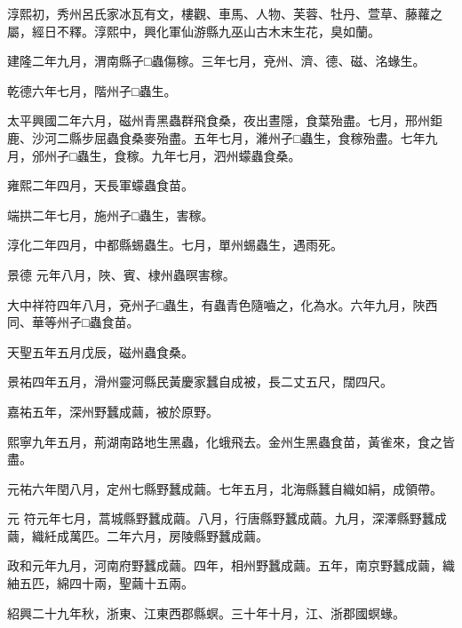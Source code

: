 \begin{pinyinscope}
 淳熙初，秀州呂氏家冰瓦有文，樓觀、車馬、人物、芙蓉、牡丹、萱草、藤蘿之屬，經日不釋。淳熙中，興化軍仙游縣九巫山古木末生花，臭如蘭。



 建隆二年九月，渭南縣孑□蟲傷稼。三年七月，兗州、濟、德、磁、洺蝝生。



 乾德六年七月，階州孑□蟲生。



 太平興國二年六月，磁州青黑蟲群飛食桑，夜出晝隱，食葉殆盡。七月，邢州鉅鹿、沙河二縣步屈蟲食桑麥殆盡。五年七月，濰州孑□蟲生，食稼殆盡。七年九月，邠州孑□蟲生，食稼。九年七月，泗州蠓蟲食桑。



 雍熙二年四月，天長軍蠓蟲食苗。



 端拱二年七月，施州孑□蟲生，害稼。



 淳化二年四月，中都縣蜴蟲生。七月，單州蜴蟲生，遇雨死。



 景德
 元年八月，陜、賓、棣州蟲暝害稼。



 大中祥符四年八月，兗州孑□蟲生，有蟲青色隨嚙之，化為水。六年九月，陜西同、華等州孑□蟲食苗。



 天聖五年五月戊辰，磁州蟲食桑。



 景祐四年五月，滑州靈河縣民黃慶家蠶自成被，長二丈五尺，闊四尺。



 嘉祐五年，深州野蠶成繭，被於原野。



 熙寧九年五月，荊湖南路地生黑蟲，化蛾飛去。金州生黑蟲食苗，黃雀來，食之皆盡。



 元祐六年閏八月，定州七縣野蠶成繭。七年五月，北海縣蠶自織如絹，成領帶。



 元
 符元年七月，蒿城縣野蠶成繭。八月，行唐縣野蠶成繭。九月，深澤縣野蠶成繭，織紝成萬匹。二年六月，房陵縣野蠶成繭。



 政和元年九月，河南府野蠶成繭。四年，相州野蠶成繭。五年，南京野蠶成繭，織紬五匹，綿四十兩，聖繭十五兩。



 紹興二十九年秋，浙東、江東西郡縣螟。三十年十月，江、浙郡國螟蝝。




\end{pinyinscope}
